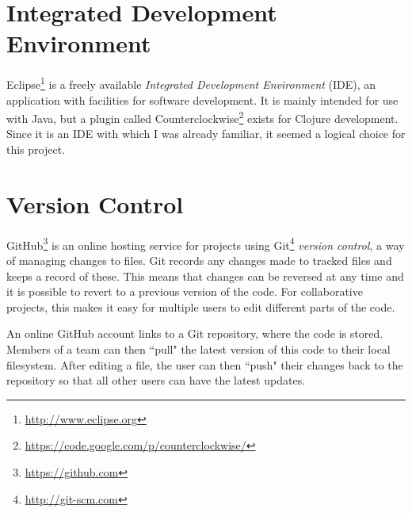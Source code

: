 \section{Integrated Development Environment}

Eclipse\footnote{\url{http://www.eclipse.org}} is a freely available \textit{Integrated Development Environment} (IDE), an application with facilities for software development. It is mainly intended for use with Java, but a plugin called Counterclockwise\footnote{\url{https://code.google.com/p/counterclockwise/}} exists for Clojure development. Since it is an IDE with which I was already familiar, it seemed a logical choice for this project. 

\section{Version Control}

GitHub\footnote{\url{https://github.com}} is an online hosting service for projects using Git\footnote{\url{http://git-scm.com}} \textit{version control}, a way of managing changes to files. Git records any changes made to tracked files and keeps a record of these. This means that changes can be reversed at any time and it is possible to revert to a previous version of the code. For collaborative projects, this makes it easy for multiple users to edit different parts of the code. 

An online GitHub account links to a Git repository, where the code is stored. Members of a team can then ``pull" the latest version of this code to their local filesystem. After editing a file, the user can then ``push" their changes back to the repository so that all other users can have the latest updates. 

